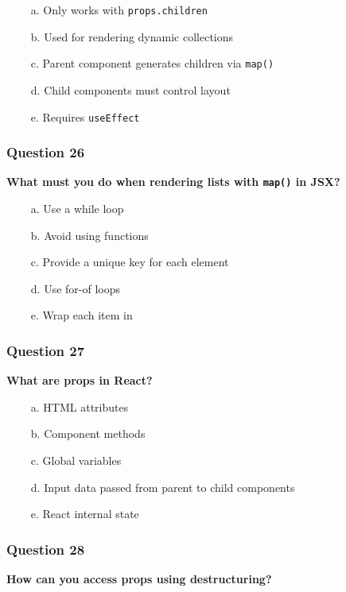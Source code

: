 \documentclass{article}
\newcommand{\cmark}{\textcolor{green}{\ding{51}}} %
\newcommand{\xmark}{\textcolor{red}{\ding{55}}}   %
\begin{document}
\begin{itemize}
  \item[\xmark\ a.] Only works with \texttt{props.children}
  \item[\cmark\ b.] Used for rendering dynamic collections
  \item[\cmark\ c.] Parent component generates children via \texttt{map()}
  \item[\xmark\ d.] Child components must control layout
  \item[\xmark\ e.] Requires \texttt{useEffect}
\end{itemize}

\subsubsection*{Question 26}
\textbf{What must you do when rendering lists with \texttt{map()} in JSX?}

\begin{itemize}
  \item[\xmark\ a.] Use a while loop
  \item[\xmark\ b.] Avoid using functions
  \item[\cmark\ c.] Provide a unique key for each element
  \item[\xmark\ d.] Use for-of loops
  \item[\xmark\ e.] Wrap each item in
\end{itemize}

\subsubsection*{Question 27}
\textbf{What are props in React?}

\begin{itemize}
  \item[\xmark\ a.] HTML attributes
  \item[\xmark\ b.] Component methods
  \item[\xmark\ c.] Global variables
  \item[\cmark\ d.] Input data passed from parent to child components
  \item[\xmark\ e.] React internal state
\end{itemize}

\subsubsection*{Question 28}
\textbf{How can you access props using destructuring?}
\end{document}
